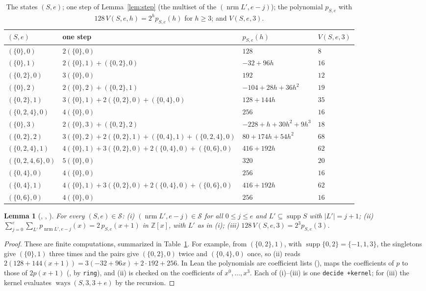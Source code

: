 \documentclass[11pt]{amsart}
\theoremstyle{plain}
\newtheorem{lemma}[theorem]{Lemma}
\theoremstyle{definition}
\newcommand{\Z}{\mathbb{Z}}
\newcommand{\supp}{\operatorname{supp}}
\newcommand{\ways}{\operatorname{ways}}
\newcommand{\nrm}{\operatorname{nrm}}
\newcommand{\St}{\mathcal{S}}
\begin{document}
\begin{table}[ht]
\footnotesize
\caption{The states $(S,e)$; one step of Lemma~\ref{lem:step} (the multiset of the $(\nrm L',e-j)$); the polynomial $p_{S,e}$ with $128\,V(S,e,h)=2^hp_{S,e}(h)$ for $h\ge3$; and $V(S,e,3)$.}\label{tab:states}
\begin{tabular}{@{}llll@{}}
\toprule
$(S,e)$ & one step & $p_{S,e}(h)$ & $V(S,e,3)$\\
\midrule
$(\{0\},0)$ & $2(\{0\},0)$ & $128$ & $8$\\
$(\{0\},1)$ & $2(\{0\},1)+(\{0,2\},0)$ & $-32+96h$ & $16$\\
$(\{0,2\},0)$ & $3(\{0\},0)$ & $192$ & $12$\\
$(\{0\},2)$ & $2(\{0\},2)+(\{0,2\},1)$ & $-104+28h+36h^2$ & $19$\\
$(\{0,2\},1)$ & $3(\{0\},1)+2(\{0,2\},0)+(\{0,4\},0)$ & $128+144h$ & $35$\\
$(\{0,2,4\},0)$ & $4(\{0\},0)$ & $256$ & $16$\\
$(\{0\},3)$ & $2(\{0\},3)+(\{0,2\},2)$ & $-228+h+30h^2+9h^3$ & $18$\\
$(\{0,2\},2)$ & $3(\{0\},2)+2(\{0,2\},1)+(\{0,4\},1)+(\{0,2,4\},0)$ & $80+174h+54h^2$ & $68$\\
$(\{0,2,4\},1)$ & $4(\{0\},1)+3(\{0,2\},0)+2(\{0,4\},0)+(\{0,6\},0)$ & $416+192h$ & $62$\\
$(\{0,2,4,6\},0)$ & $5(\{0\},0)$ & $320$ & $20$\\
$(\{0,4\},0)$ & $4(\{0\},0)$ & $256$ & $16$\\
$(\{0,4\},1)$ & $4(\{0\},1)+3(\{0,2\},0)+2(\{0,4\},0)+(\{0,6\},0)$ & $416+192h$ & $62$\\
$(\{0,6\},0)$ & $4(\{0\},0)$ & $256$ & $16$\\
\bottomrule
\end{tabular}
\end{table}

\begin{lemma}[, , ]\label{lem:finite}
For every $(S,e)\in\St$: (i) $(\nrm L',e-j)\in\St$ for all $0\le j\le e$ and $L'\subseteq\supp S$ with $|L'|=j+1$; (ii) $\sum_{j=0}^{e}\sum_{L'}p_{\nrm L',e-j}(x)=2\,p_{S,e}(x+1)$ in $\Z[x]$, with $L'$ as in (i); (iii) $128\,V(S,e,3)=2^3p_{S,e}(3)$.
\end{lemma}
\begin{proof}
These are finite computations, summarized in Table~\ref{tab:states}. For example, from $(\{0,2\},1)$, with $\supp\{0,2\}=\{-1,1,3\}$, the singletons give $(\{0\},1)$ three times and the pairs give $(\{0,2\},0)$ twice and $(\{0,4\},0)$ once, so (ii) reads $2(128+144(x+1))=3(-32+96x)+2\cdot192+256$.
In Lean the polynomials are coefficient lists (),  maps the coefficients of $p$ to those of $2p(x+1)$ (, by \texttt{ring}), and (ii) is checked on the coefficients of $x^0,\dots,x^3$. Each of (i)--(iii) is one \texttt{decide +kernel}; for (iii) the kernel evaluates $\ways(S,3,3+e)$ by the recursion.
\end{proof}
\end{document}
